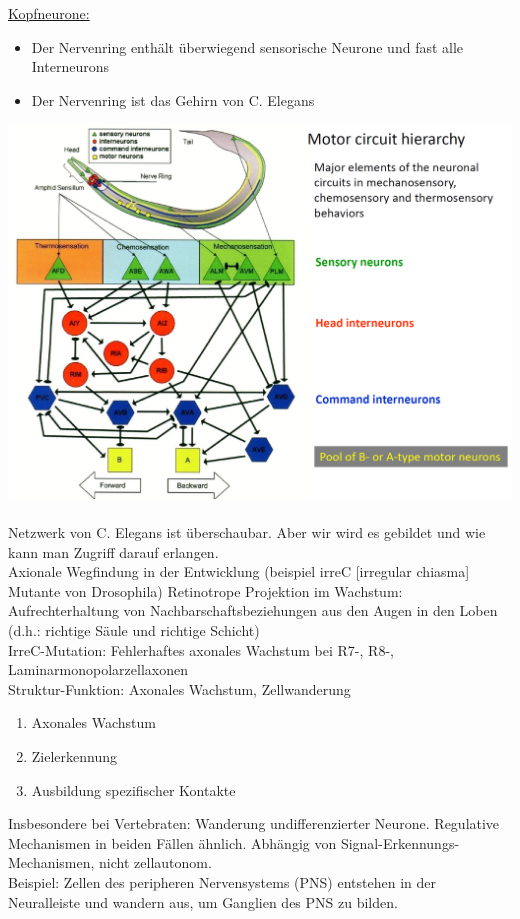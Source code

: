\underline{Kopfneurone:}
\begin{itemize}
	\item Der Nervenring enthält überwiegend sensorische Neurone und fast alle Interneurons
	\item Der Nervenring ist das Gehirn von C. Elegans
\end{itemize}

\includegraphics[width=1\textwidth]{lectures/160511/pix/c_elegans_neurones.png}
\\\\
Netzwerk von C. Elegans ist überschaubar. Aber wir wird es gebildet und wie kann man Zugriff darauf erlangen.\\

Axionale Wegfindung in der Entwicklung (beispiel irreC [irregular chiasma] Mutante von Drosophila)
Retinotrope Projektion im Wachstum: Aufrechterhaltung von Nachbarschaftsbeziehungen aus den Augen in den Loben (d.h.: richtige Säule und richtige Schicht)\\

IrreC-Mutation: Fehlerhaftes axonales Wachstum bei R7-, R8-, Laminarmonopolarzellaxonen\\

Struktur-Funktion: Axonales Wachstum, Zellwanderung
\begin{enumerate}
	\item Axonales Wachstum
	\item Zielerkennung
	\item Ausbildung spezifischer Kontakte
\end{enumerate}

Insbesondere bei Vertebraten: Wanderung undifferenzierter Neurone.
Regulative Mechanismen in beiden Fällen ähnlich. Abhängig von Signal-Erkennungs-Mechanismen, nicht zellautonom.\\

Beispiel: Zellen des peripheren Nervensystems (PNS) entstehen in der Neuralleiste und wandern aus, um Ganglien des PNS zu bilden.\\